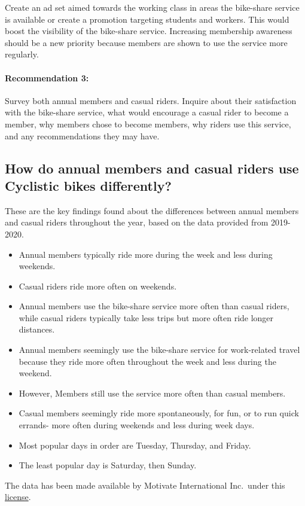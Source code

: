 \documentclass[
]{article}
\providecommand{\tightlist}{%
  \setlength{\itemsep}{0pt}\setlength{\parskip}{0pt}}
\begin{document}
Create an ad set aimed towards the working class in areas the bike-share
service is available or create a promotion targeting students and
workers. This would boost the visibility of the bike-share service.
Increasing membership awareness should be a new priority because members
are shown to use the service more regularly.

\paragraph{Recommendation 3:}\label{recommendation-3}

Survey both annual members and casual riders. Inquire about their
satisfaction with the bike-share service, what would encourage a casual
rider to become a member, why members chose to become members, why
riders use this service, and any recommendations they may have.

\subsection{How do annual members and casual riders use Cyclistic bikes
differently?}\label{how-do-annual-members-and-casual-riders-use-cyclistic-bikes-differently}

These are the key findings found about the differences between annual
members and casual riders throughout the year, based on the data
provided from 2019-2020.

\begin{itemize}
\tightlist
\item
  Annual members typically ride more during the week and less during
  weekends.
\item
  Casual riders ride more often on weekends.
\item
  Annual members use the bike-share service more often than casual
  riders, while casual riders typically take less trips but more often
  ride longer distances.
\item
  Annual members seemingly use the bike-share service for work-related
  travel because they ride more often throughout the week and less
  during the weekend.
\item
  However, Members still use the service more often than casual members.
\item
  Casual members seemingly ride more spontaneously, for fun, or to run
  quick errands- more often during weekends and less during week days.
\item
  Most popular days in order are Tuesday, Thursday, and Friday.
\item
  The least popular day is Saturday, then Sunday.
\end{itemize}

The data has been made available by Motivate International Inc.~under
this \href{https://divvybikes.com/data-license-agreement}{license}.
\end{document}
